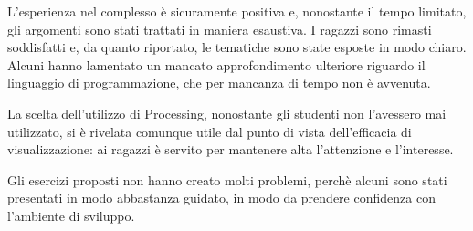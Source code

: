 L'esperienza nel complesso è sicuramente positiva e, nonostante il tempo limitato, gli argomenti sono stati trattati in maniera esaustiva. I ragazzi sono rimasti soddisfatti e, da quanto riportato, le tematiche sono state esposte in modo chiaro. Alcuni hanno lamentato un mancato approfondimento ulteriore riguardo il linguaggio di programmazione, che per mancanza di tempo non è avvenuta. 

La scelta dell'utilizzo di Processing, nonostante gli studenti non l'avessero mai utilizzato, si è rivelata comunque utile dal punto di vista dell'efficacia di visualizzazione: ai ragazzi è servito per mantenere alta l'attenzione e l'interesse. 

Gli esercizi proposti non hanno creato molti problemi, perchè alcuni sono stati presentati in modo abbastanza guidato, in modo da prendere confidenza con l'ambiente di sviluppo.